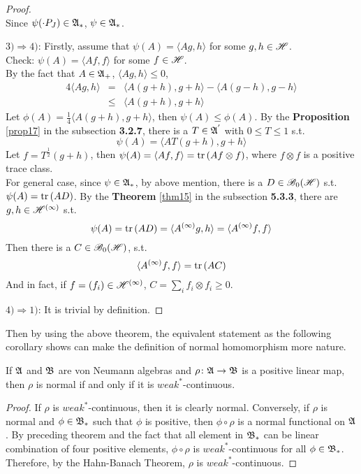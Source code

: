 \begin{proof}
\begin{equation*}
	\end{equation*}
	Since $\psi(\cdot P_J) \in \mathfrak{A}_*$, $\psi \in \mathfrak{A}_*$.
	\item $3) \Rightarrow 4)$: Firstly, assume that $\psi(A) = \langle Ag,h \rangle$ for some $g,h \in \mathscr{H}$. \\
	Check: $\psi(A) = \langle Af, f \rangle$ for some $f \in \mathscr{H}$. \\
	By the fact that $A \in \mathfrak{A}_+$, $\langle Ag,h \rangle \leqslant 0$, 
	\begin{eqnarray*}
		4\langle Ag,h \rangle &=& \langle A(g+h),g+h \rangle - \langle A(g-h),g-h \rangle \\
		&\leqslant& \langle A(g+h),g+h \rangle
	\end{eqnarray*}
	Let $\phi(A) = \frac{1}{4}\langle A(g+h),g+h \rangle$, then $\psi(A) \leqslant \phi(A)$. By the \textbf{Proposition} \ref{prop17} in the subsection \textbf{3.2.7}, there is a $T \in \mathfrak{A}^{'}$ with $0 \leqslant T \leqslant 1$ s.t. 
	\begin{equation*}
		\psi(A) =  \langle AT(g+h),g+h \rangle
	\end{equation*}
	Let $f = T^{\frac{1}{2}}(g+h)$, then $\psi(A) = \langle Af, f \rangle =  \operatorname{tr}{(Af \otimes f)}$, where $f \otimes f$ is a positive trace class. \\
	For general case, since $\psi \in \mathfrak{A}_*$, by above mention, there is a $D \in \mathscr{B}_{0}\mathscr{(H)}$ s.t. $\psi(A) = \operatorname{tr}{(AD)}$. By the \textbf{Theorem} \ref{thm15} in the subsection \textbf{5.3.3}, there are $g, h \in \mathscr{H}^{(\infty)}$  s.t.
	\begin{equation*}
		\psi(A)  = \operatorname{tr}{(AD)} = \langle A^{(\infty)}g,h \rangle = \langle A^{(\infty)}f,f \rangle
	\end{equation*} 
	Then there is a $C \in \mathscr{B}_{0}\mathscr{(H)}$, s.t.
	\begin{equation*}
		\langle A^{(\infty)}f,f \rangle = \operatorname{tr}{(AC)}
	\end{equation*}
	And in fact, if $f = (f_i) \in \mathscr{H}^{(\infty)}$, $C = \sum_i f_i \otimes f_i \geqslant 0$.
	\item $4) \Rightarrow 1)$: It is trivial by definition.
\end{proof}

Then by using the above theorem, the equivalent statement as the following corollary shows can make the definition of normal homomorphism more nature.

\begin{cor}
	If $\mathfrak{A}$ and $\mathfrak{B}$ are von Neumann algebras and $\rho \colon \mathfrak{A} \rightarrow \mathfrak{B}$ is a positive linear map, then $\rho$ is normal if and only if it is $weak^*$-continuous. 
\end{cor}
\begin{proof}
	If $\rho$ is $weak^*$-continuous, then it is clearly normal. Conversely, if $\rho$ is normal and $\phi \in \mathfrak{B}_*$ such that $\phi$ is positive, then $\phi \circ  \rho$ is a normal functional on $\mathfrak{A}$. By preceding theorem and the fact that all element in $\mathfrak{B}_*$ can be linear combination of four positive elements, $\phi \circ  \rho$ is $weak^*$-continuous for all $\phi \in \mathfrak{B}_*$. Therefore, by the Hahn-Banach Theorem, $\rho$ is $weak^*$-continuous.
\end{proof}


